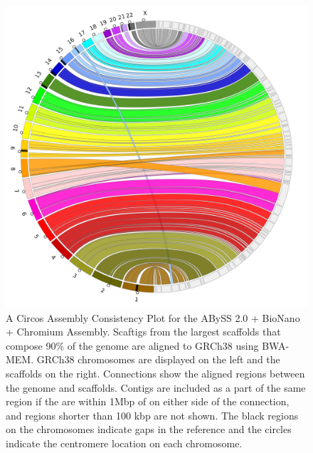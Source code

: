 \documentclass[
  12pt,
  oneside,
  openany]{book}
\begin{document}
\begin{appendices}
\begin{figure}
\hypertarget{fig:jup3}{%
\centering
\includegraphics{abyss2-appendix/abyss2_bionano_arcs.png}
\caption[A Circos Assembly Consistency Plot for the ABySS 2.0 + BioNano + Chromium Assembly.]{A Circos Assembly Consistency Plot for the ABySS 2.0 + BioNano + Chromium Assembly. Scaftigs from the largest scaffolds that compose 90\% of the genome are aligned to GRCh38 using BWA-MEM. GRCh38 chromosomes are displayed on the left and the scaffolds on the right. Connections show the aligned regions between the genome and scaffolds. Contigs are included as a part of the same region if the are within 1Mbp of on either side of the connection, and regions shorter than 100 kbp are not shown. The black regions on the chromosomes indicate gaps in the reference and the circles indicate the centromere location on each chromosome.}\label{fig:jup3}
}
\end{figure}


\end{appendices}
\end{document}
